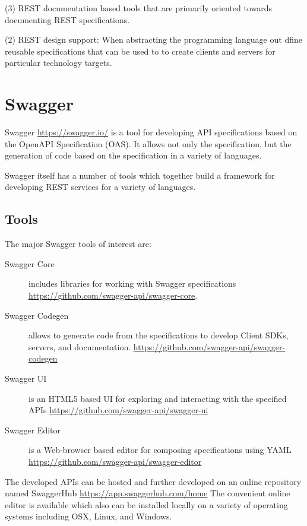 (3) REST documentation based tools that are primarily oriented towards
documenting REST specifications.

(2) REST design support: When abstracting the programming language out
dfine reusable specifications that can be used to to create clients
and servers for particular technology targets.

\section{Swagger}

Swagger \url{https://swagger.io/} is a tool for developing API
specifications based on the OpenAPI Specification (OAS). It allows not
only the specification, but the generation of code based on the
specification in a variety of languages.

Swagger itself has a number of tools which together build a framework
for developing REST services for a variety of languages.


\subsection{Tools}

The major Swagger tools of interest are:

\begin{description}

\item[Swagger Core] includes libraries for working with Swagger
 specifications \url{https://github.com/swagger-api/swagger-core}.

\item[Swagger Codegen] allows to generate code from the specifications
 to develop Client SDKs, servers, and documentation. \url{https://github.com/swagger-api/swagger-codegen}

\item[Swagger UI] is an HTML5 based UI for exploring and interacting
 with the specified APIs \url{https://github.com/swagger-api/swagger-ui}

\item[Swagger Editor] is a Web-browser based editor for composing 
 specifications using YAML \url{https://github.com/swagger-api/swagger-editor}

\end{description}

The developed APIs can be hosted and further developed on an
online repository named SwaggerHub \url{https://app.swaggerhub.com/home}
The convenient online editor is available which also can be installed
locally on a variety of operating systems including OSX, Linux, and
Windows. 


